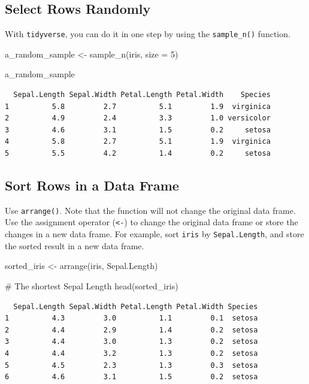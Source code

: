 \documentclass[
  letterpaper,
]{book}
\newenvironment{Shaded}{\begin{snugshade}}{\end{snugshade}}
\newcommand{\AttributeTok}[1]{\textcolor[rgb]{0.40,0.45,0.13}{#1}}
\newcommand{\CommentTok}[1]{\textcolor[rgb]{0.37,0.37,0.37}{#1}}
\newcommand{\DecValTok}[1]{\textcolor[rgb]{0.68,0.00,0.00}{#1}}
\newcommand{\FunctionTok}[1]{\textcolor[rgb]{0.28,0.35,0.67}{#1}}
\newcommand{\NormalTok}[1]{\textcolor[rgb]{0.00,0.23,0.31}{#1}}
\newcommand{\OtherTok}[1]{\textcolor[rgb]{0.00,0.23,0.31}{#1}}
\begin{document}
\subsection{Select Rows Randomly}\label{select-rows-randomly-1}

With \texttt{tidyverse}, you can do it in one step by using the
\texttt{sample\_n()} function.

\begin{Shaded}
\begin{Highlighting}[]
\NormalTok{a\_random\_sample }\OtherTok{\textless{}{-}} \FunctionTok{sample\_n}\NormalTok{(iris, }\AttributeTok{size =} \DecValTok{5}\NormalTok{)}

\NormalTok{a\_random\_sample}
\end{Highlighting}
\end{Shaded}

\begin{verbatim}
  Sepal.Length Sepal.Width Petal.Length Petal.Width    Species
1          5.8         2.7          5.1         1.9  virginica
2          4.9         2.4          3.3         1.0 versicolor
3          4.6         3.1          1.5         0.2     setosa
4          5.8         2.7          5.1         1.9  virginica
5          5.5         4.2          1.4         0.2     setosa
\end{verbatim}

\subsection{Sort Rows in a Data Frame}\label{sort-rows-in-a-data-frame}

Use \texttt{arrange()}. Note that the function will not change the
original data frame. Use the assignment operator (\texttt{\textless{}-})
to change the original data frame or store the changes in a new data
frame. For example, sort \texttt{iris} by \texttt{Sepal.Length}, and
store the sorted result in a new data frame.

\begin{Shaded}
\begin{Highlighting}[]
\NormalTok{sorted\_iris }\OtherTok{\textless{}{-}} \FunctionTok{arrange}\NormalTok{(iris, Sepal.Length)}

\CommentTok{\# The shortest Sepal Length}
\FunctionTok{head}\NormalTok{(sorted\_iris)}
\end{Highlighting}
\end{Shaded}

\begin{verbatim}
  Sepal.Length Sepal.Width Petal.Length Petal.Width Species
1          4.3         3.0          1.1         0.1  setosa
2          4.4         2.9          1.4         0.2  setosa
3          4.4         3.0          1.3         0.2  setosa
4          4.4         3.2          1.3         0.2  setosa
5          4.5         2.3          1.3         0.3  setosa
6          4.6         3.1          1.5         0.2  setosa
\end{verbatim}
\end{document}
